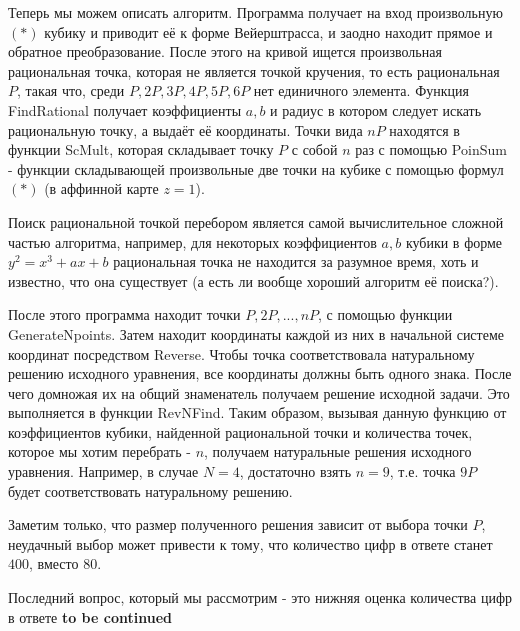 Теперь мы можем описать алгоритм. Программа получает на вход произвольную
\((*)\) кубику и приводит её к форме Вейерштрасса, и заодно находит прямое и
обратное преобразование. После этого на кривой ищется произвольная
рациональная точка, которая не является точкой кручения, то есть  рациональная
\(P\), такая что, среди \(P, 2P, 3P, 4P, 5P, 6P\) нет единичного элемента.
Функция \textsf{FindRational} получает коэффициенты \(a, b\) и радиус в
котором следует искать рациональную точку,  а выдаёт её координаты. Точки вида
\(nP\) находятся в функции \textsf{ScMult}, которая складывает точку \(P\) с
собой \(n\) раз с помощью \textsf{PoinSum} - функции складывающей произвольные
две точки на кубике с помощью формул  \((*)\) (в аффинной карте \(z = 1\)). 

\begin{remark}
    Поиск рациональной точкой перебором является самой вычислительное
    сложной частью алгоритма, например, для некоторых коэффициентов \(a, b\) кубики в
    форме \(y^2 = x^3 + ax + b\) рациональная точка не находится за разумное
    время, хоть и известно, что она существует (а есть ли вообще хороший алгоритм 
    её поиска?). 
\end{remark}

После этого программа находит точки \(P, 2P, ... , nP\), с помощью функции
\textsf{GenerateNpoints}. Затем находит координаты каждой из них в начальной системе
координат посредством Reverse. Чтобы точка соответствовала натуральному
решению исходного уравнения, все координаты должны быть одного знака. После
чего домножая их на общий знаменатель получаем решение исходной задачи. Это
выполняется в функции \textsf{RevNFind}. Таким образом, вызывая данную функцию от
коэффициентов кубики, найденной рациональной точки и  количества точек,
которое мы хотим перебрать - \(n\), получаем натуральные решения исходного
уравнения. Например, в случае \(N = 4\), достаточно взять \(n = 9\), т.е.
точка \(9P\) будет соответствовать натуральному решению.
 
Заметим только, что размер полученного решения зависит от выбора точки \(P\),
неудачный выбор может привести к тому, что количество цифр в ответе станет
\(400\), вместо \(80\).

Последний вопрос, который мы рассмотрим - это нижняя оценка количества цифр в
ответе \textbf{to be continued}

